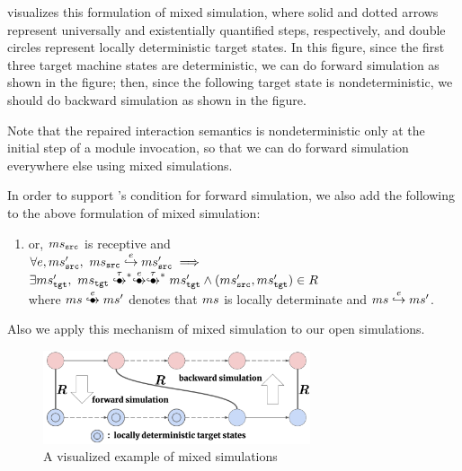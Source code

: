  visualizes this formulation of mixed simulation, where
solid and dotted arrows represent universally and existentially
quantified steps, respectively, and double circles represent locally
deterministic target states. In this figure,
since the first three target machine states are deterministic,
we can do forward simulation as shown in the figure;
then, since the following target state is nondeterministic,
we should do backward simulation as shown in the figure.

Note that the repaired interaction semantics is nondeterministic only
at the initial step of a module invocation, so that we can do
forward simulation everywhere else using mixed simulations.

In order to support \cc{}'s condition for forward simulation,
we also add the following to the above formulation of mixed simulation:
\begin{enumerate}[resume]
\item or, $ms{}_{\texttt{src}{}}$ is receptive and\\
  $\forall e, ms{}_{\texttt{src}{}}',~ ms{}_{\texttt{src}{}} \stackrel{e}{\hookrightarrow} ms{}_{\texttt{src}{}}' \implies {} $ \\
  $ \exists \mstgt',~ \mstgt \exstep{\tau}^{\raisebox{-1mm}{\scriptsize$\ast$}} \exstep{e}\exstep{\tau}^{\raisebox{-1mm}{\scriptsize$\ast$}} \mstgt' \land (\mssrc', \mstgt') \in R$\\
  where $\ms \exstep{e} \ms'$ denotes that $ms$ is locally determinate and $ms \stackrel{e}{\hookrightarrow} ms'$.
\end{enumerate}
Also we apply this mechanism of mixed simulation to our open simulations.

\begin{figure}[t]%
\includegraphics[width=0.7\textwidth]{images/mixed-sim-bold.pdf}
\caption{A visualized example of mixed simulations}
\label{fig:mixedsim}
\end{figure}
